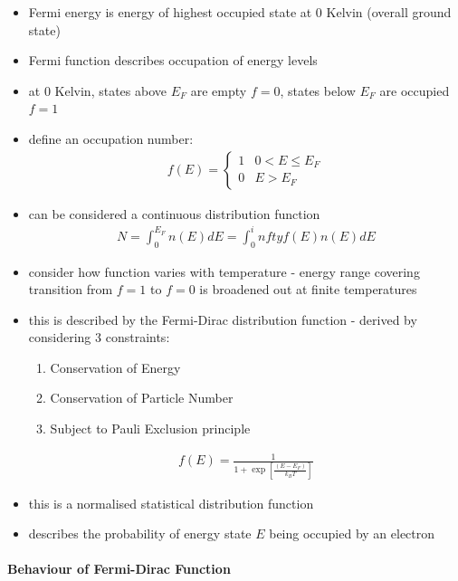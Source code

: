 \documentclass[a4paper,11pt,normalem]{article}
\begin{document}
\begin{itemize}
    \item Fermi energy is energy of highest occupied state at 0 Kelvin (overall ground state)
    \item Fermi function describes occupation of energy levels
    \item at 0 Kelvin, states above \(E_F\) are empty \(f=0\), states below \(E_F\) are occupied \(f=1\)
    \item define an occupation number:
        \begin{align*}
            f(E) = \begin{cases} 1 & 0 < E \leq E_F \\ 0 & E > E_F \end{cases}
        \end{align*}
    \item can be considered a continuous distribution function
        \begin{align*}
            N = \int_0^{E_F} n(E)dE = \int_0^infty f(E)n(E)dE
        \end{align*}
    \item consider how function varies with temperature - energy range covering transition from \(f=1\) to \(f=0\) is broadened out at finite temperatures
    \item this is described by the Fermi-Dirac distribution function - derived by considering 3 constraints:
        \begin{enumerate}
            \item Conservation of Energy
            \item Conservation of Particle Number
            \item Subject to Pauli Exclusion principle
        \end{enumerate}
        \begin{align*}
            f(E) = \frac{1}{1 + \exp\left[\frac{(E-E_F)}{k_BT}\right]}
        \end{align*}
    \item this is a normalised statistical distribution function
    \item describes the probability of energy state \(E\) being occupied by an electron
\end{itemize}

\paragraph{Behaviour of Fermi-Dirac Function}
\end{document}
